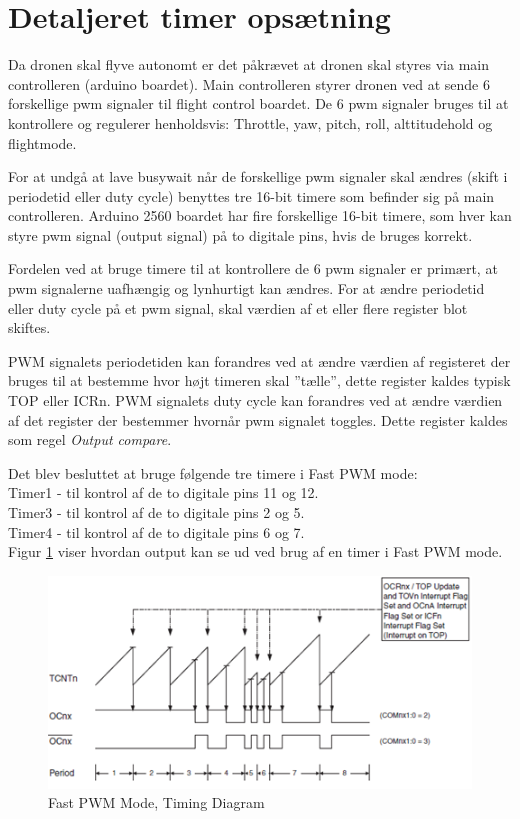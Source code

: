 \section{Detaljeret timer opsætning}

Da dronen skal flyve autonomt er det påkrævet at dronen skal styres via main controlleren (arduino boardet). Main controlleren styrer dronen ved at sende 6 forskellige pwm signaler til flight control boardet. De 6 pwm signaler bruges til at kontrollere og regulerer henholdsvis: Throttle, yaw, pitch, roll, alttitudehold og flightmode.

For at undgå at lave busywait når de forskellige pwm signaler skal ændres (skift i periodetid eller duty cycle) benyttes tre 16-bit timere som befinder sig på main controlleren. Arduino 2560 boardet har fire forskellige 16-bit timere, som hver kan styre pwm signal (output signal) på to digitale pins, hvis de  bruges korrekt. 

Fordelen ved at bruge timere til at kontrollere de 6 pwm signaler er primært, at pwm signalerne uafhængig og lynhurtigt kan ændres. For at ændre periodetid eller duty cycle på et pwm signal, skal værdien af et eller flere register blot skiftes. 

PWM signalets periodetiden kan forandres ved at ændre værdien af registeret der bruges til at bestemme hvor højt timeren skal ”tælle”, dette register kaldes typisk TOP eller ICRn. 
PWM signalets duty cycle kan forandres ved at ændre værdien af det register der bestemmer hvornår pwm signalet toggles. Dette register kaldes som regel \textit{Output compare}.

Det blev besluttet at bruge følgende tre timere i Fast PWM mode: \\
Timer1 - til kontrol af de to digitale pins 11 og 12.\\
Timer3 -  til kontrol af de to digitale pins 2 og 5.\\
Timer4 - til kontrol af de to digitale pins 6 og 7. \\

Figur \ref{fig:Timing_diagram} viser hvordan output kan se ud ved brug af en timer i Fast PWM mode.  

\begin{figure}[H]
	\centering
	\includegraphics[width=1.\textwidth]{Billeder/Timer/0_timing_diagram.png}
	\caption{Fast PWM Mode, Timing Diagram}
	\label{fig:Timing_diagram}
\end{figure}


